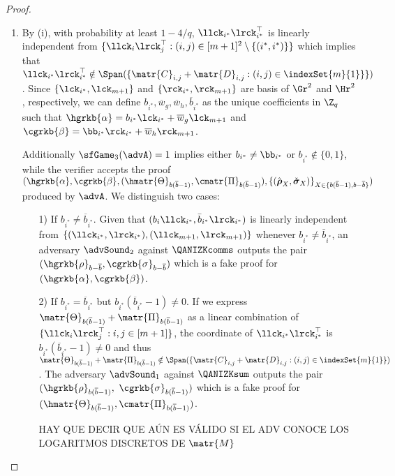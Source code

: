 \begin{proof}
\begin{enumerate}[label=(\roman*)]
\item By (i), with probability at least $1-4/q$, $\llck_{i^*}\lrck_{i^*}^\top$ is linearly independent from
$\{\llck_{i}\lrck_j^\top:(i,j)\in[m+1]^2\setminus\{(i^*, i^*)\}\}$ which implies that $\llck_{i^*}\lrck_{i^*}^\top\notin\Span(\{\matr{C}_{i,j}+\matr{D}_{i,j}:(i,j)\in\indexSet{m}{1}\}\})$. Since $\{\lck_{i^*},\lck_{m+1}\}$ and $\{\rck_{i^*},\rck_{m+1}\}$ are basis of $\Gr^2$ and $\Hr^2$, respectively,
we can define $b_{i^*},\overline{w}_g,\overline{w}_h,\overline{b}_{i^*}$ as the unique coefficients in $\Z_q$ such that $\hgrkb{\alpha}=b_{i^*}\lck_{i^*} + \overline{w}_g \lck_{m+1}$ and $\cgrkb{\beta}= \bb_{i^*} \rck_{i^*} + \overline{w}_h \rck_{m+1}$.

Additionally  $\sfGame_3(\advA)=1$ implies either $b_{i^*}\neq\bb_{i^*}$ or $b_{i^*} \notin \{0,1\}$,
while the verifier accepts the proof
$ (
        \hgrkb{\alpha}, \cgrkb{\beta},
        (\hmatr{\Theta}_{b(\overline{b}-1)}, \cmatr{\Pi}_{b(\overline{b}-1)}), 
        \{(\hat{\boldsymbol \rho}_{X}, \check{\boldsymbol \sigma}_{X})\}_{X \in \{b(\overline{b}-1), b-\overline{b}\}} )$
  produced by $\advA$.
We distinguish two cases:
\begin{itemize}
\item[1)] If $b_{i^*} \neq \overline{b}_{i^*}$. Given that $(b_{i}\llck_{i^*},\bar{b}_{i^*}\lrck_{i^*})$ is linearly independent from $\{(\llck_{i^*},\lrck_{i^*}),(\llck_{m+1},\lrck_{m+1})\}$
whenever $b_{i^*}\neq\bar{b}_{i^*}$, an adversary
$\advSound_2$ against $\QANIZKcomms$
outputs the pair $(\hgrkb{\rho}_{b-\overline{b}},
\cgrkb{\sigma}_{b-\overline{b}})
$ which is a fake proof for 
$(\hgrkb{\alpha},\cgrkb{\beta})$.
\item[2)] If $b_{i^*} = \overline{b}_{i^*}$ but 
$b_{i^*}(\overline{b}_{i^*} -1) \neq 0$.
If we express $\matr{\Theta}_{b(\overline{b}-1)}+\matr{\Pi}_{b(\overline{b}-1)}$
as a linear combination of $\{\llck_{i}\lrck_{j}^{\top}:i,j\in[m+1]\}$, the coordinate of
$\llck_{i^*}\lrck_{i^*}^\top$ is $b_{i^*}(\overline{b}_{i^*}-1)\neq 0$ and thus $\matr{\Theta}_{b(\overline{b}-1)}+\matr{\Pi}_{b(\overline{b}-1)}\notin\Span(\{\matr{C}_{i,j}+\matr{D}_{i,j}:(i,j)\in\indexSet{m}{1}\})$.
The adversary $\advSound_1$ against $\QANIZKsum$  outputs the pair
$(\hgrkb{\rho}_{b(\overline{b}-1)},$ $\cgrkb{\sigma}_{b(\overline{b}-1)})$
which is a fake proof for $(\hmatr{\Theta}_{b(\overline{b}-1)}, \cmatr{\Pi}_{b(\overline{b}-1)})$.

{\color{red} HAY QUE DECIR QUE \cite[Theorem~2]{EC:KilWee15} A\'UN ES V\'ALIDO SI EL ADV CONOCE LOS LOGARITMOS DISCRETOS DE $\matr{M}$}
\end{itemize}

\end{enumerate}
\end{proof}

